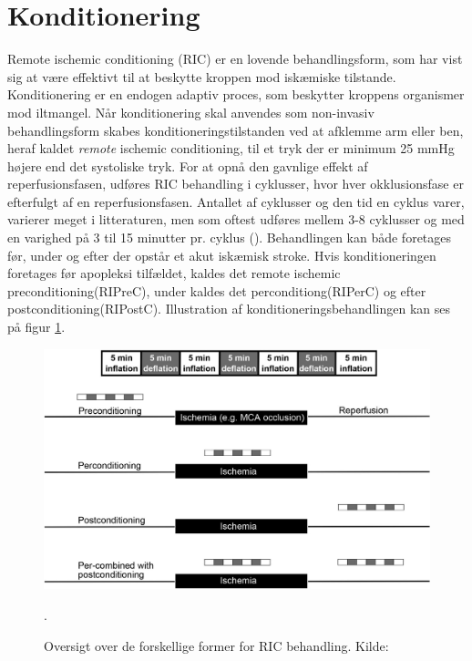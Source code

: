 \section{Konditionering}
Remote ischemic conditioning (RIC) er en lovende behandlingsform, som har vist sig at være effektivt til at beskytte kroppen mod iskæmiske tilstande. Konditionering er en endogen adaptiv proces, som beskytter kroppens organismer mod iltmangel. Når konditionering skal anvendes som non-invasiv behandlingsform skabes konditioneringstilstanden ved at afklemme arm eller ben, heraf kaldet \textit{remote} ischemic conditioning, til et tryk der er minimum 25 mmHg højere end det systoliske tryk. For at opnå den gavnlige effekt af reperfusionsfasen, udføres RIC behandling i cyklusser, hvor hver okklusionsfase er efterfulgt af en reperfusionsfasen. Antallet af cyklusser og den tid en cyklus varer, varierer meget i litteraturen, men som oftest udføres mellem 3-8 cyklusser og med en varighed på 3 til 15 minutter pr. cyklus (\cite{RefWorks:3}).
Behandlingen kan både foretages før, under og efter der opstår et akut iskæmisk stroke. Hvis konditioneringen foretages før apopleksi tilfældet, kaldes det remote ischemic preconditioning(RIPreC), under kaldes det perconditiong(RIPerC) og efter postconditioning(RIPostC). Illustration af konditioneringsbehandlingen kan ses på figur \ref{fig:cycles}.

\begin{figure}[H]
	\includegraphics[width = \textwidth]{billeder/PrePerPostKonditionering.png}
	\caption{Oversigt over de forskellige former for RIC behandling. Kilde: \cite{RefWorks:3}}\label{fig:cycles}. 
\end{figure}

